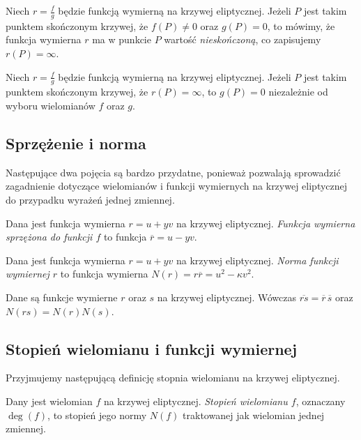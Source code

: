 \begin{definition}
Niech $r = \frac{f}{g}$ będzie funkcją wymierną na krzywej eliptycznej.
Jeżeli $P$ jest takim punktem skończonym krzywej,
że $f(P) \neq 0$ oraz $g(P) = 0$,
to mówimy, że funkcja wymierna $r$ ma w punkcie $P$
wartość \emph{nieskończoną},
co zapisujemy $r(P) = \infty$.
\end{definition}

\begin{theorem}
Niech $r = \frac{f}{g}$ będzie funkcją wymierną na krzywej eliptycznej.
Jeżeli $P$ jest takim punktem skończonym krzywej,
że $r(P) = \infty$,
to $g(P) = 0$ niezależnie od wyboru wielomianów $f$ oraz $g$.
\end{theorem}

\subsection*{Sprzężenie i norma}

Następujące dwa pojęcia są bardzo przydatne,
ponieważ pozwalają sprowadzić
zagadnienie dotyczące wielomianów i funkcji wymiernych na krzywej eliptycznej
do przypadku wyrażeń jednej zmiennej.

\begin{definition}
Dana jest funkcja wymierna $r = u + yv$ na krzywej eliptycznej.
\emph{Funkcja wymierna sprzężona do funkcji $f$}
to funkcja $\overline{r} = u - yv$.
\end{definition}

\begin{definition}
Dana jest funkcja wymierna $r = u + yv$ na krzywej eliptycznej.
\emph{Norma funkcji wymiernej $r$}
to funkcja wymierna $N(r) = r\overline{r} = u^2 - \kappa v^2$.
\end{definition}

\begin{fact}
Dane są funkcje wymierne $r$ oraz $s$ na krzywej eliptycznej.
Wówczas $\overline{rs} = \overline{r}\,\overline{s}$
oraz $N(rs) = N(r)N(s)$.
\end{fact}

\subsection*{Stopień wielomianu i funkcji wymiernej}

Przyjmujemy następującą definicję stopnia wielomianu na krzywej eliptycznej.

\begin{definition}
Dany jest wielomian $f$ na krzywej eliptycznej.
\emph{Stopień wielomianu $f$},
oznaczany $\deg(f)$,
to stopień jego normy $N(f)$ traktowanej jak wielomian jednej zmiennej.
\end{definition}

